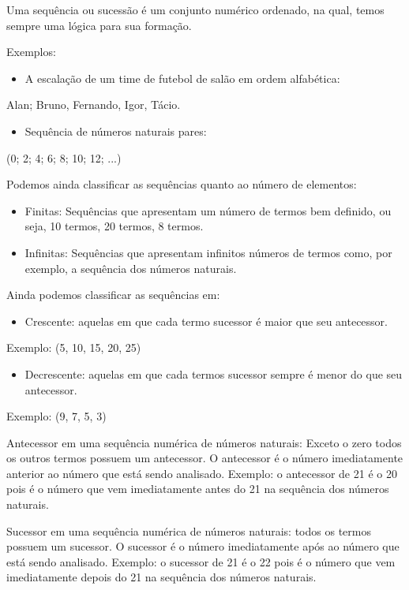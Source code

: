 Uma sequência ou sucessão é um conjunto numérico ordenado, na qual,
temos sempre uma lógica para sua formação.

Exemplos:

\begin{itemize}
\item
  A escalação de um time de futebol de salão em ordem alfabética:
\end{itemize}

Alan; Bruno, Fernando, Igor, Tácio.

\begin{itemize}
\item
  Sequência de números naturais pares:
\end{itemize}

(0; 2; 4; 6; 8; 10; 12; ...)

Podemos ainda classificar as sequências quanto ao número de elementos:

\begin{itemize}
\item
  Finitas: Sequências que apresentam um número de termos bem definido,
  ou seja, 10 termos, 20 termos, 8 termos.
\item
  Infinitas: Sequências que apresentam infinitos números de termos como,
  por exemplo, a sequência dos números naturais.
\end{itemize}

Ainda podemos classificar as sequências em:

\begin{itemize}
\item
  Crescente: aquelas em que cada termo sucessor é maior que seu
  antecessor.
\end{itemize}

Exemplo: (5, 10, 15, 20, 25)

\begin{itemize}
\item
  Decrescente: aquelas em que cada termos sucessor sempre é menor do que
  seu antecessor.
\end{itemize}

Exemplo: (9, 7, 5, 3)

Antecessor em uma sequência numérica de números naturais: Exceto o zero
todos os outros termos possuem um antecessor. O antecessor é o número
imediatamente anterior ao número que está sendo analisado. Exemplo: o
antecessor de 21 é o 20 pois é o número que vem imediatamente antes do
21 na sequência dos números naturais.

Sucessor em uma sequência numérica de números naturais: todos os termos
possuem um sucessor. O sucessor é o número imediatamente após ao número
que está sendo analisado. Exemplo: o sucessor de 21 é o 22 pois é o
número que vem imediatamente depois do 21 na sequência dos números
naturais.

